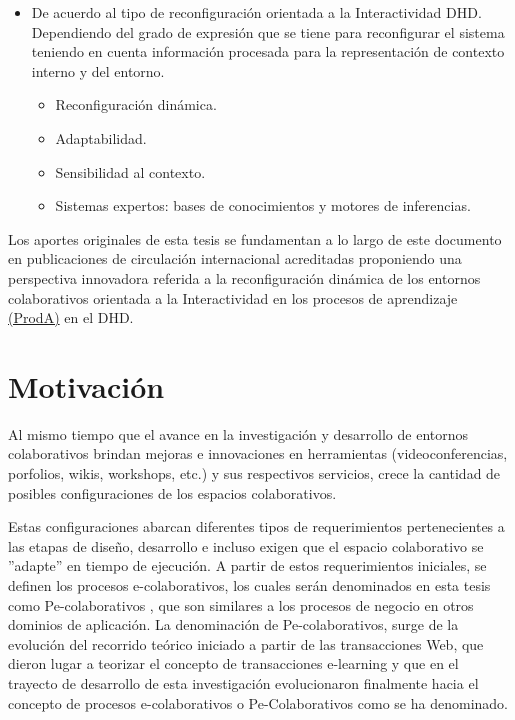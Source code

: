 \begin{itemize}
\item De acuerdo al tipo de reconfiguración orientada a la Interactividad
DHD\cite{libro.unr}. Dependiendo del grado de expresión que se tiene para
reconfigurar el sistema teniendo en cuenta información procesada
para la representación de contexto interno y del entorno.

\begin{itemize}
 \item Reconfiguración dinámica.
 \item Adaptabilidad.
\item Sensibilidad al contexto.
\item Sistemas expertos: bases de conocimientos y motores de inferencias.
\end{itemize}

\end{itemize}


Los aportes originales de esta tesis se fundamentan a lo largo de este documento en publicaciones de circulación internacional acreditadas proponiendo una perspectiva innovadora referida a la reconfiguración dinámica de los entornos colaborativos orientada a la Interactividad en los procesos de aprendizaje \hyperref[ProdA]{(ProdA)}  en el DHD. 


\section{Motivación}\label{sec:motivacion}


Al mismo tiempo que el avance en la investigación y desarrollo de entornos colaborativos brindan mejoras e innovaciones en herramientas (videoconferencias, porfolios, wikis, workshops, etc.) y sus respectivos servicios, crece la cantidad de posibles configuraciones de los espacios colaborativos.

Estas configuraciones abarcan diferentes tipos de requerimientos pertenecientes a las  etapas de diseño, desarrollo e incluso exigen que el espacio colaborativo se ''adapte'' en tiempo de ejecución. A partir de estos requerimientos iniciales, se definen los procesos e-colaborativos, los cuales serán denominados en esta tesis como Pe-colaborativos \cite{cacic2007.7}, que son similares a los procesos de negocio en otros dominios de aplicación. La denominación de Pe-colaborativos, surge de la evolución del recorrido teórico iniciado a partir de las transacciones Web, que dieron lugar a teorizar el concepto de transacciones e-learning \cite{cacic2007} y que en el trayecto de desarrollo de esta investigación evolucionaron finalmente hacia el concepto de procesos e-colaborativos o Pe-Colaborativos como se ha denominado. 


